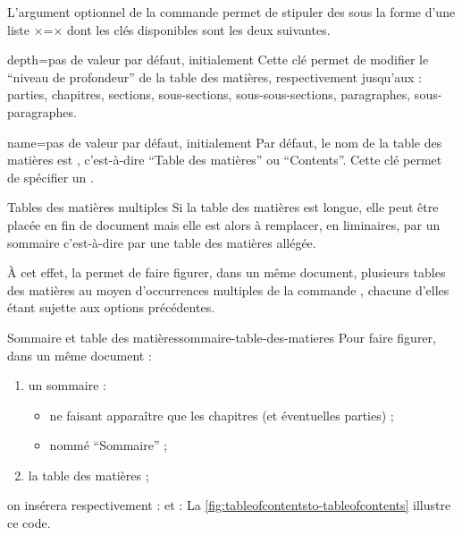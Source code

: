 L'argument optionnel de la commande  permet de stipuler
des  sous la forme d'une liste ×=× dont
les clés disponibles sont les deux suivantes.
{%
  \begin{docKey}{depth}{=\textbar{}\textbar{}\textbar{}\textbar{}\textbar{}\textbar{}}{pas
      de valeur par défaut, initialement }
    Cette clé permet de modifier le \enquote{niveau de profondeur} de la table
    des matières, respectivement jusqu'aux : parties, chapitres, sections,
    sous-sections, sous-sous-sections, paragraphes, sous-paragraphes.
  \end{docKey}
}
%
\begin{docKey}{name}{=}{pas de valeur par défaut,
    initialement }
  Par défaut, le nom de la table des matières est ,
  c'est-à-dire \enquote{Table des matières} ou
  \foreignquote{english}{Contents}\selonlangue{}. Cette clé permet de spécifier
  un .
\end{docKey}

\begin{dbremark}{Tables des matières multiples}{}
  Si la table des matières est longue, elle peut être placée en fin de document
  mais elle est alors à remplacer, en \glspl{liminaire}, par un sommaire
  c'est-à-dire par une table des matières allégée.

  À cet effet, la \yatcl{} permet de faire figurer, dans un même document,
  plusieurs tables des matières au moyen d'occurrences multiples de la commande
  , chacune d'elles étant sujette aux options
  précédentes.
\end{dbremark}

\begin{dbexample}{Sommaire et table des matières}{sommaire-table-des-matieres}
  Pour faire figurer, dans un même document :
  \begin{enumerate}
  \item un sommaire :
    \begin{itemize}
    \item ne faisant apparaître que les chapitres (et éventuelles parties) ;
    \item nommé \enquote{Sommaire} ;
    \end{itemize}
  \item la table des matières ;
  \end{enumerate}
  on insérera respectivement :
   et :
   La
  \vref{fig:tableofcontentsto-tableofcontents} illustre ce code.
\end{dbexample}

